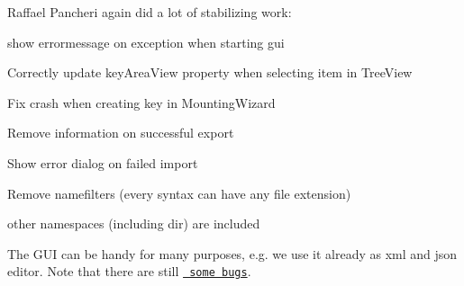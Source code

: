 Raffael Pancheri again did a lot of stabilizing work\+:


\begin{DoxyItemize}
\item show errormessage on exception when starting gui
\item Correctly update key\+Area\+View property when selecting item in Tree\+View
\item Fix crash when creating key in Mounting\+Wizard
\item Remove information on successful export
\item Show error dialog on failed import
\item Remove namefilters (every syntax can have any file extension)
\item other namespaces (including dir) are included
\end{DoxyItemize}

The G\+UI can be handy for many purposes, e.\+g. we use it already as xml and json editor. Note that there are still \href{https://git.libelektra.org/issues}{\texttt{ some bugs}}.


